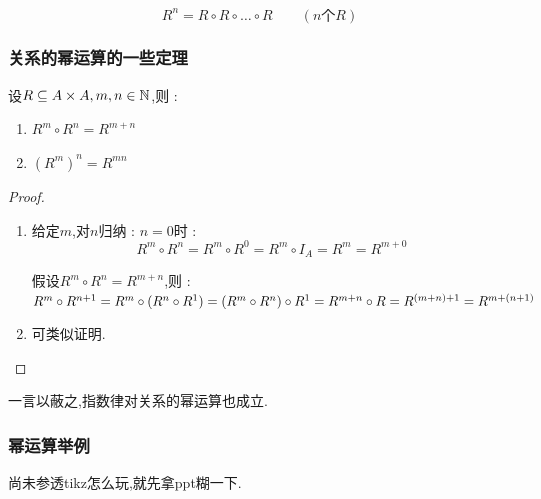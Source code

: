 {{{{    $$
      R^n = R \circ R \circ \dots \circ R\qquad(n\mbox{个}R)
    $$

  }%

  \subsubsection{关系的幂运算的一些定理}{
    设$R \subseteq A \times A,m,n \in \operatorname{\mathbb{N}}$,则 : \begin{enumerate}
      \item $R^m \circ R^n = R^{m + n}$
      \item $(R^m)^n = R^{mn}$
    \end{enumerate}

    \begin{proof}
      \begin{enumerate}
        \item {
              给定$m$,对$n$归纳 : $n = 0$时 : $$
                R^m \circ R^n = R^m \circ R^0 = R^m \circ I_A = R^m = R^{m + 0}
              $$

              假设$R^m \circ R^n = R^{m + n}$,则 :
              \begin{math}
                R^m \circ R^{n + 1} \\
                = R^m \circ (R^n \circ R^1) \\
                = (R^m \circ R^n) \circ R^1 \\
                = R^{m + n} \circ R \\
                = R^{(m + n) + 1} \\
                = R^{m + (n + 1)}
              \end{math}
              }
        \item 可类似证明.
      \end{enumerate}
    \end{proof}

    一言以蔽之,指数律对关系的幂运算也成立.
  }%

  \subsubsection{幂运算举例}{
    尚未参透tikz怎么玩,就先拿ppt糊一下.

}}}}
